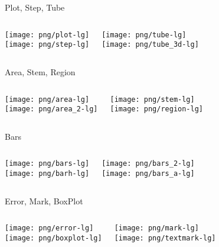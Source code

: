 \documentclass[color=usenames]{beamer}
\begin{document}
\begin{frame}{Plot, Step, Tube}
\begin{columns}
\texttt{[image: png/plot-lg]}\\
\texttt{[image: png/step-lg]}

\texttt{[image: png/tube-lg]}\\
\texttt{[image: png/tube\_3d-lg]}

\end{columns}
\end{frame}

\begin{frame}{Area, Stem, Region}
\begin{columns}
\texttt{[image: png/area-lg]}\\
\texttt{[image: png/area\_2-lg]}

\texttt{[image: png/stem-lg]}\\
\texttt{[image: png/region-lg]}

\end{columns}
\end{frame}

\begin{frame}{Bars}
\begin{columns}
\texttt{[image: png/bars-lg]}\\
\texttt{[image: png/barh-lg]}

\texttt{[image: png/bars\_2-lg]}\\
\texttt{[image: png/bars\_a-lg]}

\end{columns}
\end{frame}

\begin{frame}{Error, Mark, BoxPlot}
\begin{columns}
\texttt{[image: png/error-lg]}\\
\texttt{[image: png/boxplot-lg]}

\texttt{[image: png/mark-lg]}\\
\texttt{[image: png/textmark-lg]}

\end{columns}
\end{frame}
\end{document}
